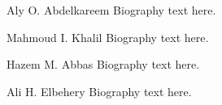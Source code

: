 \documentclass[10pt,journal,compsoc]{IEEEtran}
\begin{document}





% 

\begin{IEEEbiography}{Aly O. Abdelkareem}
Biography text here.
\end{IEEEbiography}

\begin{IEEEbiographynophoto}{Mahmoud I. Khalil}
Biography text here.
\end{IEEEbiographynophoto}


\begin{IEEEbiographynophoto}{Hazem M. Abbas}
Biography text here.
\end{IEEEbiographynophoto}


\begin{IEEEbiographynophoto}{Ali H. Elbehery}
	Biography text here.
\end{IEEEbiographynophoto}






\end{document}
